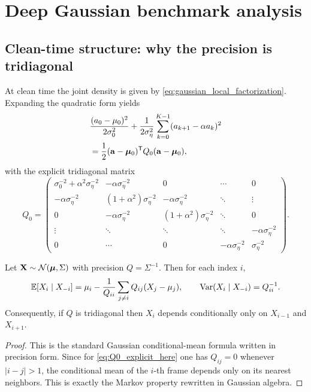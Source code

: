 \documentclass[11pt]{article}
\begin{document}
\section{Deep Gaussian benchmark analysis}

\subsection{Clean-time structure: why the precision is tridiagonal}

At clean time the joint density is given by \eqref{eq:gaussian_local_factorization}. Expanding the quadratic form yields
\begin{align}
&\frac{(a_0-\mu_0)^2}{2\sigma_0^2}
+\frac{1}{2\sigma_\eta^2}\sum_{k=0}^{K-1}(a_{k+1}-\alpha a_k)^2 \\
&= \frac12(\mathbf a-\boldsymbol\mu_0)^{\mathsf{T}} Q_0(\mathbf a-\boldsymbol\mu_0),
\end{align}
with the explicit tridiagonal matrix
\begin{equation}\label{eq:Q0_explicit_here}
Q_0=
\begin{pmatrix}
\sigma_0^{-2}+\alpha^2\sigma_\eta^{-2} & -\alpha\sigma_\eta^{-2} & 0 & \cdots & 0 \\
-\alpha\sigma_\eta^{-2} & (1+\alpha^2)\sigma_\eta^{-2} & -\alpha\sigma_\eta^{-2} & \ddots & \vdots \\
0 & -\alpha\sigma_\eta^{-2} & (1+\alpha^2)\sigma_\eta^{-2} & \ddots & 0 \\
\vdots & \ddots & \ddots & \ddots & -\alpha\sigma_\eta^{-2} \\
0 & \cdots & 0 & -\alpha\sigma_\eta^{-2} & \sigma_\eta^{-2}
\end{pmatrix}.
\end{equation}

\begin{proposition}
Let $\mathbf X\sim\mathcal{N}(\boldsymbol\mu,\Sigma)$ with precision $Q=\Sigma^{-1}$. Then for each index $i$,
\begin{equation}
 \mathbb{E}[X_i\mid X_{-i}]
 =\mu_i-\frac{1}{Q_{ii}}\sum_{j\neq i}Q_{ij}(X_j-\mu_j),
 \qquad
 \operatorname{Var}(X_i\mid X_{-i})=Q_{ii}^{-1}.
\end{equation}
Consequently, if $Q$ is tridiagonal then $X_i$ depends conditionally only on $X_{i-1}$ and $X_{i+1}$.
\end{proposition}

\begin{proof}
This is the standard Gaussian conditional-mean formula written in precision form. Since for \eqref{eq:Q0_explicit_here} one has $Q_{ij}=0$ whenever $|i-j|>1$, the conditional mean of the $i$-th frame depends only on its nearest neighbors. This is exactly the Markov property rewritten in Gaussian algebra.
\end{proof}
\end{document}
